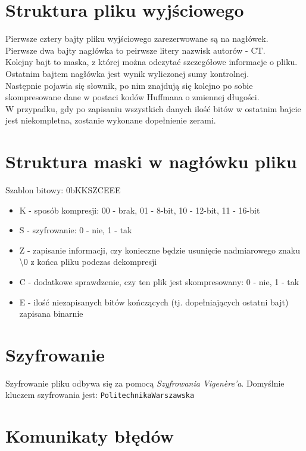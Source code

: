 \documentclass[]{article}
\begin{document}
\section{Struktura pliku wyjściowego}\label{header-n279}
Pierwsze cztery bajty pliku wyjściowego zarezerwowane są na nagłówek. \\
Pierwsze dwa bajty nagłówka to peirwsze litery nazwisk autorów - CT.\\
Kolejny bajt to maska, z której można odczytać szczegółowe informacje o pliku. Ostatnim bajtem nagłówka jest wynik wyliczonej sumy kontrolnej.\\
Następnie pojawia się słownik, po nim znajdują się kolejno po sobie skompresowane dane w postaci kodów Huffmana o zmiennej długości.\\
W przypadku, gdy po zapisaniu wszystkich danych ilość bitów w ostatnim bajcie jest niekompletna, zostanie wykonane dopełnienie zerami.
\section{Struktura maski w nagłówku pliku}\label{header-n279}

    Szablon bitowy: 0bKKSZCEEE
\begin{itemize}
    \item K - sposób kompresji: 00 - brak, 01 - 8-bit, 10 - 12-bit, 11 - 16-bit
   \item  S - szyfrowanie: 0 - nie, 1 - tak
   \item  Z - zapisanie informacji, czy konieczne będzie usunięcie nadmiarowego znaku \textbackslash0 z końca pliku podczas dekompresji
   \item  C - dodatkowe sprawdzenie, czy ten plik jest skompresowany: 0 - nie, 1 - tak
   \item  E - ilość niezapisanych bitów kończących (tj. dopełniających ostatni bajt) zapisana binarnie
\end{itemize}
 \section{Szyfrowanie}\label{header-n281} 
Szyfrowanie pliku odbywa się za pomocą \emph{Szyfrowania Vigenère’a}. Domyślnie kluczem szyfrowania jest: 
\texttt{Politechnika\textunderscore Warszawska}

\section{Komunikaty błędów}\label{header-n281}
\end{document}
